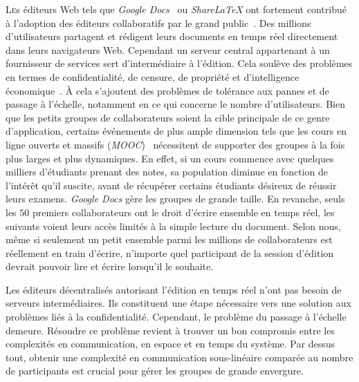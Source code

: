 
\lettrine{L}es éditeurs Web tels que \emph{Google Docs}~\cite{googledocs} ou
\emph{ShareLaTeX}\cite{sharelatex} ont fortement contribué à l'adoption des
éditeurs collaboratifs par le grand public~\cite{mogan2010impact}. Des millions
d'utilisateurs partagent et rédigent leurs documents en temps réel directement
dans leurs navigateurs Web. Cependant un serveur central appartenant à un
fournisseur de services sert d'intermédiaire à l'édition. Cela soulève des
problèmes en termes de confidentialité, de censure, de propriété et
d'intelligence économique~\cite{cherrueau2016composer, gellman2013us,
pearson2011toward}. À cela s'ajoutent des problèmes de tolérance aux pannes et
de passage à l'échelle, notamment en ce qui concerne le nombre
d'utilisateurs. Bien que les petits groupes de collaborateurs soient la cible
principale de ce genre d'application, certains événements de plus ample
dimension tels que les cours en ligne ouverts et massifs
(\emph{MOOC})~\cite{breslow2013studying} nécessitent de supporter des groupes à
la fois plus larges et plus dynamiques. En effet, si un cours commence avec
quelques milliers d'étudiants prenant des notes, sa population diminue en
fonction de l'intérêt qu'il suscite, avant de récupérer certains étudiants
désireux de réussir leurs examens. \emph{Google Docs} gère les groupes de grande
taille. En revanche, seuls les $50$ premiers collaborateurs ont le droit
d'écrire ensemble en temps réel, les suivants voient leurs accès limités à la
simple lecture du document. Selon nous, même si seulement un petit ensemble
parmi les millions de collaborateurs est réellement en train d'écrire, n'importe
quel participant de la session d'édition devrait pouvoir lire et écrire
lorsqu'il le souhaite.

Les éditeurs décentralisés autorisant l'édition en temps réel n'ont pas besoin
de serveurs intermédiaires. Ils constituent une étape nécessaire vers une
solution aux problèmes liés à la confidentialité. Cependant, le problème du
passage à l'échelle demeure. Résoudre ce problème revient à trouver un bon
compromis entre les complexités en communication, en espace et en temps du
système. Par dessus tout, obtenir une complexité en communication sous-linéaire
comparée au nombre de participants est crucial pour gérer les groupes de grande
envergure.

